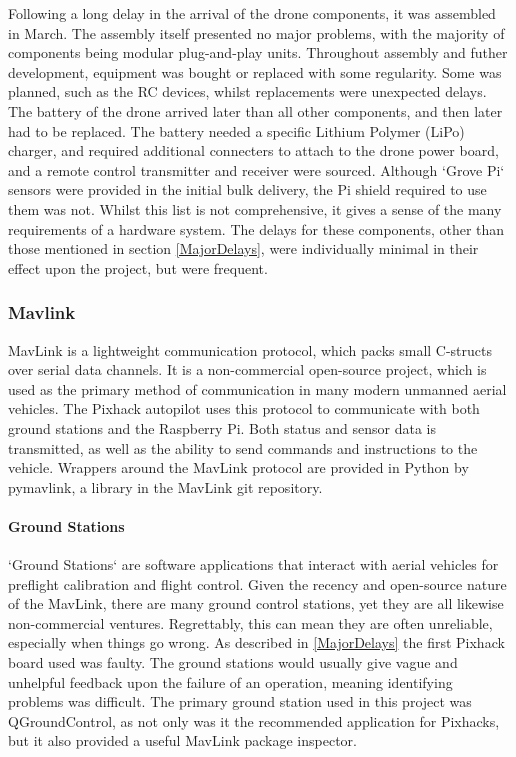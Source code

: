 \documentclass{article}
\begin{document}
Following a long delay in the arrival of the drone components, it was assembled in March. The assembly itself presented no major problems, with the majority of components being modular plug-and-play units. Throughout assembly and futher development, equipment was bought or replaced with some regularity. Some was planned, such as the RC devices, whilst replacements were unexpected delays. The battery of the drone arrived later than all other components, and then later had to be replaced. The battery needed a specific Lithium Polymer (LiPo) charger, and required additional connecters to attach to the drone power board, and a remote control transmitter and receiver were sourced. Although `Grove Pi` sensors were provided in the initial bulk delivery, the Pi shield required to use them was not. Whilst this list is not comprehensive, it gives a sense of the many requirements of a hardware system. The delays for these components, other than those mentioned in section \ref{MajorDelays}, were individually minimal in their effect upon the project, but were frequent. 

\subsubsection{Mavlink}
MavLink is a lightweight communication protocol, which packs small C-structs over serial data channels\cite{qGroundMavlink}. It is a non-commercial open-source project, which is used as the primary method of communication in many modern unmanned aerial vehicles. The Pixhack autopilot uses this protocol to communicate with both ground stations and the Raspberry Pi. Both status and sensor data is transmitted, as well as the ability to send commands and instructions to the vehicle. Wrappers around the MavLink protocol are provided in Python by pymavlink, a library in the MavLink git repository.

\paragraph{Ground Stations}
`Ground Stations` are software applications that interact with aerial vehicles for preflight calibration and flight control. Given the recency and open-source nature of the MavLink, there are many ground control stations, yet they are all likewise non-commercial ventures. Regrettably, this can mean they are often unreliable, especially when things go wrong. As described in \ref{MajorDelays} the first Pixhack board used was faulty. The ground stations would usually give vague and unhelpful feedback upon the failure of an operation, meaning identifying problems was difficult. The primary ground station used in this project was QGroundControl\cite{qGroundControl}, as not only was it the recommended application for Pixhacks, but it also provided a useful MavLink package inspector. 
\end{document}
